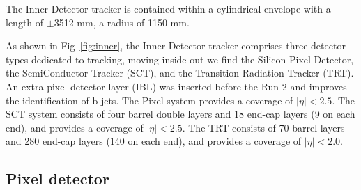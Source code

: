 The Inner Detector tracker is contained within a cylindrical envelope with a length of $\pm$3512 mm, a radius of 1150 mm.
\par As shown in Fig~\ref{fig:inner}, the Inner Detector tracker comprises three detector types dedicated to tracking, moving inside out we find the Silicon Pixel Detector, the SemiConductor Tracker (SCT), and the Transition Radiation Tracker (TRT). An extra pixel detector layer (IBL)\cite{Capeans:1291633} was inserted before the Run 2 and improves the identification of b-jets\cite{ATL-PHYS-PUB-2015-022}. The Pixel system provides a coverage of $|\eta|<2.5$.
The SCT system consists of four barrel double layers and 18 end-cap layers (9 on each end)\cite{Aad:2014mta}, and provides a coverage of $|\eta| < 2.5$.
The TRT consists of 70 barrel layers and 280 end-cap layers (140 on each end), and provides a coverage of $|\eta| < 2.0$\cite{Aad:2014mta}.


\subsection{Pixel detector}
\label{sec:pixel}


